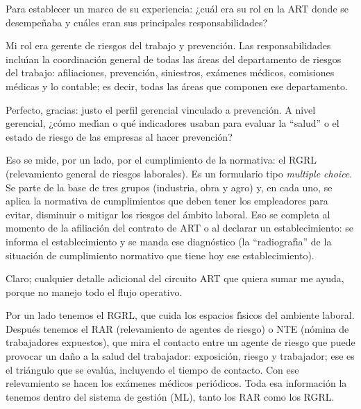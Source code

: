 \begin{description}[style=nextline, leftmargin=0cm, labelsep=0.35cm]

\item[\textbf{Entrevistador:}]
Para establecer un marco de su experiencia: ¿cu\'al era su rol en la ART donde se desempe\~naba y cu\'ales eran sus principales responsabilidades?

\item[\textbf{Entrevistado:}]
Mi rol era gerente de riesgos del trabajo y prevenci\'on.
Las responsabilidades inclu\'{\i}an la coordinaci\'on general de todas las \'areas del departamento de riesgos del trabajo: afiliaciones, prevenci\'on, siniestros, ex\'amenes m\'edicos, comisiones m\'edicas y lo contable; es decir, todas las \'areas que componen ese departamento.

\item[\textbf{Entrevistador:}]
Perfecto, gracias: justo el perfil gerencial vinculado a prevenci\'on.
A nivel gerencial, ¿c\'omo med\'{\i}an o qu\'e indicadores usaban para evaluar la ``salud'' o el estado de riesgo de las empresas al hacer prevenci\'on?

\item[\textbf{Entrevistado:}]
Eso se mide, por un lado, por el cumplimiento de la normativa: el RGRL (relevamiento general de riesgos laborales).
Es un formulario tipo \emph{multiple choice}.
Se parte de la base de tres grupos (industria, obra y agro) y, en cada uno, se aplica la normativa de cumplimientos que deben tener los empleadores para evitar, disminuir o mitigar los riesgos del \'ambito laboral.
Eso se completa al momento de la afiliaci\'on del contrato de ART o al declarar un establecimiento: se informa el establecimiento y se manda ese diagn\'ostico (la ``radiograf\'{\i}a'' de la situaci\'on de cumplimiento normativo que tiene hoy ese establecimiento).

\item[\textbf{Entrevistador:}]
Claro; cualquier detalle adicional del circuito ART que quiera sumar me ayuda, porque no manejo todo el flujo operativo.

\item[\textbf{Entrevistado:}]
Por un lado tenemos el RGRL, que cuida los espacios f\'{\i}sicos del ambiente laboral.
Despu\'es tenemos el RAR (relevamiento de agentes de riesgo) o NTE (n\'omina de trabajadores expuestos), que mira el contacto entre un agente de riesgo que puede provocar un da\~no a la salud del trabajador: exposici\'on, riesgo y trabajador; ese es el tri\'angulo que se eval\'ua, incluyendo el tiempo de contacto.
Con ese relevamiento se hacen los ex\'amenes m\'edicos peri\'odicos.
Toda esa informaci\'on la tenemos dentro del sistema de gesti\'on (ML), tanto los RAR como los RGRL.


\end{description}
